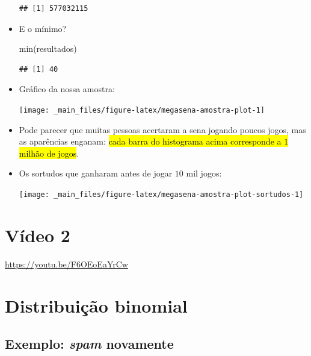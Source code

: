 \documentclass[
  11pt]{report}
\newenvironment{Shaded}{\begin{snugshade}}{\end{snugshade}}
\newcommand{\FunctionTok}[1]{\textcolor[rgb]{0.00,0.00,0.00}{#1}}
\newcommand{\NormalTok}[1]{#1}
\renewenvironment{Shaded}{
    \begin{mdframed}[%
      roundcorner=2pt,%
      innerleftmargin=5pt,%
      innerrightmargin=5pt,%
      topline=true,%
      leftline=true,%
      rightline=true,%
      bottomline=true,%
      linewidth=0.5pt,%
      linecolor=black!20,%
      backgroundcolor=black!2,%
      skipabove=2ex,%
      skipbelow=2.5ex%
    ]%
  }
  {
    \end{mdframed}
  }
\begin{document}
\begin{itemize}
\begin{verbatim}
## [1] 577032115
\end{verbatim}
\item
  E o mínimo?

\begin{Shaded}
\begin{Highlighting}[]
\FunctionTok{min}\NormalTok{(resultados)}
\end{Highlighting}
\end{Shaded}

\begin{verbatim}
## [1] 40
\end{verbatim}
\item
  Gráfico da nossa amostra:

  \begin{center}\texttt{[image: \_main\_files/figure-latex/megasena-amostra-plot-1]} \end{center}
\item
  Pode parecer que muitas pessoas acertaram a sena jogando poucos jogos, mas as aparências enganam: {\hl{cada barra do histograma acima corresponde a $1$ milhão de jogos}}.
\item
  Os sortudos que ganharam antes de jogar $10$ mil jogos:

  \begin{center}\texttt{[image: \_main\_files/figure-latex/megasena-amostra-plot-sortudos-1]} \end{center}
\end{itemize}

\hypertarget{vuxeddeo-2-4}{%
\section{Vídeo 2}\label{vuxeddeo-2-4}}

\begin{center} \url{https://youtu.be/F6OEoEaYrCw} \end{center}

\hypertarget{distribuiuxe7uxe3o-binomial}{%
\section{Distribuição binomial}\label{distribuiuxe7uxe3o-binomial}}

\hypertarget{exemplo-spam-novamente}{%
\subsection{\texorpdfstring{Exemplo: \emph{spam} novamente}{Exemplo: spam novamente}}\label{exemplo-spam-novamente}}
\end{document}
